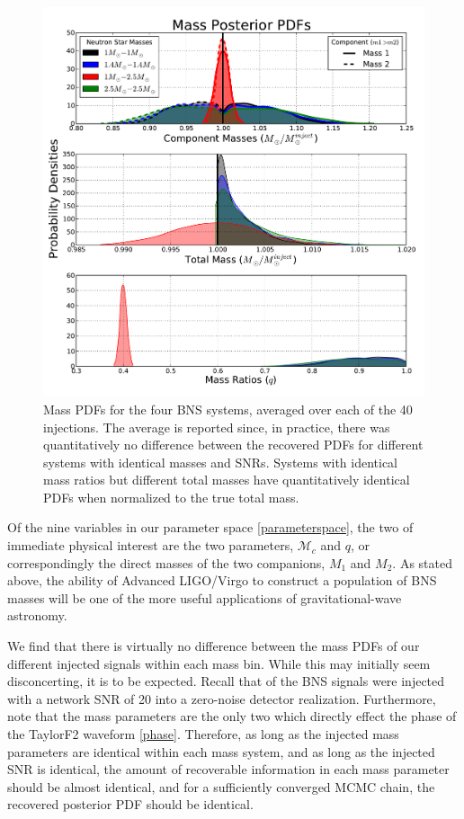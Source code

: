 \documentclass[11pt,a4paper]{emulateapj}
\newcommand{\chmass}{\mathcal{M}_c}
\begin{document}
\begin{figure}[ht!]
  \centering
 \includegraphics[trim=2cm 0cm 2cm 0cm, clip=false,scale=0.7]{newMasses.pdf}
 \caption{Mass PDFs for the four BNS systems, averaged over each of the 40 injections.  The average is reported since, in practice, there was quantitatively no difference between the recovered PDFs for different systems with identical masses and SNRs.  Systems with identical mass ratios but different total masses have quantitatively identical PDFs when normalized to the true total mass.}
  \label{metaMassPDFs}
\end{figure}

Of the nine variables in our parameter space \eqref{parameterspace}, the two of immediate physical
interest are the two parameters, $\chmass$ and $q$, or correspondingly the direct masses 
of the two companions, $M_1$ and $M_2$.    As stated above, the ability of
Advanced LIGO/Virgo to construct a population of BNS masses will be one of the more useful applications
of gravitational-wave astronomy.

We find that there is virtually no difference between the mass PDFs of our different injected signals
within each mass bin.  While this may initially seem disconcerting, it is to be expected.  Recall that of the BNS signals were injected with a network SNR of 20 into a zero-noise detector realization.  Furthermore, note that the mass parameters are the only two which directly effect the phase of the TaylorF2 waveform \eqref{phase}.  Therefore, as long as the injected mass parameters are identical within each mass system, and as long as the injected SNR is identical, the amount of recoverable information in each mass parameter should be almost identical, and for a sufficiently converged MCMC chain, the recovered posterior PDF should be identical.  
\end{document}
